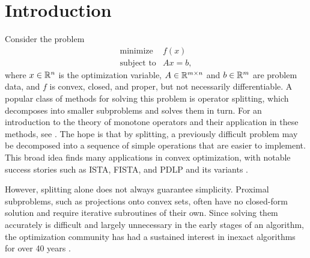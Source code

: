 \documentclass[11pt]{article}
\begin{document}
\section{Introduction}\label{sec:introduction}
Consider the problem
\begin{equation}\label{eq:linearly-constrained-problem}
    \begin{array}{ll}
        \text{minimize} & f(x)\\
        \text{subject to} & Ax = b,
    \end{array}
\end{equation}
where $x \in \mathbb{R}^n$ is the optimization variable, $A \in \mathbb{R}^{m\times n}$ and $b\in\mathbb{R}^m$ are problem data, and $f$ is convex, closed, and proper, but not necessarily differentiable.
A popular class of methods for solving this problem is operator splitting, which decomposes  into smaller subproblems and solves them in turn.
For an introduction to the theory of monotone operators and their application in these methods, see \citet{Ryu_Yin_OptimizationMonotoneOperators}.
The hope is that by splitting, a previously difficult problem may be decomposed into a sequence of simple operations that are easier to implement.
This broad idea finds many applications in convex optimization, with notable success stories such as ISTA, FISTA, and PDLP and its variants \citep{ISTA-original-paper,FISTA-original-paper,applegate2022practicallargescalelinearprogramming-pdlp-paper}.

However, splitting alone does not always guarantee simplicity.
Proximal subproblems, such as projections onto convex sets, often have no closed-form solution and require iterative subroutines of their own.
Since solving them accurately is difficult and largely unnecessary in the early stages of an algorithm, the optimization community has had a sustained interest in inexact algorithms for over 40 years \citep{rockafellar-ppm-paper,EcksteinBertsekasDouglasRachfordSplitting,svaiter2018weaklyconvergentfullyinexact,alves2025generalframeworkinexactsplitting,liang2015convergenceratesinexactnonexpansive,schmidt2011convergenceratesinexactproximalgradient,BarrePEPInexactMethods,CortildInexactKMIterations}.
\end{document}
